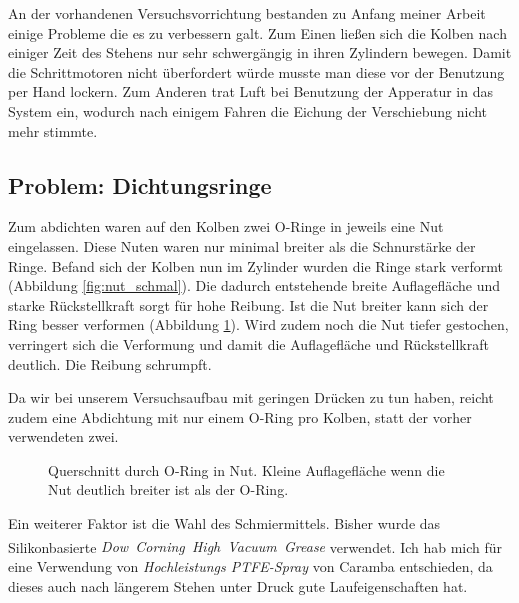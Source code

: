 \documentclass[
    11pt,
    ngerman
]{scrreprt}
\begin{document}
An der vorhandenen Versuchsvorrichtung bestanden zu Anfang meiner Arbeit einige
Probleme die es zu verbessern galt. Zum Einen ließen sich die Kolben nach
einiger Zeit des Stehens nur sehr schwergängig in ihren Zylindern bewegen.
Damit die Schrittmotoren nicht überfordert würde musste man diese vor der
Benutzung per Hand lockern. Zum Anderen trat Luft bei Benutzung der Apperatur
in das System ein, wodurch nach einigem Fahren die Eichung der Verschiebung
nicht mehr stimmte.  

\subsection{Problem: Dichtungsringe}

Zum abdichten waren auf den Kolben zwei O-Ringe in jeweils eine Nut
eingelassen. Diese Nuten waren nur minimal breiter als die Schnurstärke der
Ringe. Befand sich der Kolben nun im Zylinder wurden die Ringe stark verformt
(Abbildung \ref{fig:nut_schmal}). Die dadurch entstehende breite Auflagefläche
und starke Rückstellkraft sorgt für hohe Reibung. Ist die Nut breiter kann sich
der Ring besser verformen (Abbildung \ref{fig:nut_breit}). Wird zudem noch die
Nut tiefer gestochen, verringert sich die Verformung und damit die
Auflagefläche und Rückstellkraft deutlich. Die Reibung schrumpft.

Da wir bei unserem Versuchsaufbau mit geringen Drücken zu tun haben, reicht
zudem eine Abdichtung mit nur einem O-Ring pro Kolben, statt der vorher
verwendeten zwei.

\begin{figure}[htbp]
\begin{minipage}[htbp]{.45\textwidth}
    \centering
    
    \caption{%
        Querschnitt durch O-Ring in Nut. Breite Auflagefläche des O-Rings bei zu schmaler Nut.
    }
    \label{fig:nut_schmal}
\end{minipage}
\hfill
\begin{minipage}[htbp]{.45\textwidth}
    \centering
    
    \caption{%
        Querschnitt durch O-Ring in Nut. Kleine Auflagefläche wenn die Nut deutlich breiter ist als der O-Ring.
    }
    \label{fig:nut_breit}
\end{minipage}
\end{figure}

Ein weiterer Faktor ist die Wahl des Schmiermittels. Bisher wurde das
Silikonbasierte \emph{Dow~Corning\textsuperscript{\textregistered}~High~Vacuum~Grease} verwendet. Ich
hab mich für eine Verwendung von \emph{Hochleistungs
\textsc{PTFE}-Spray} von Caramba entschieden, da dieses auch nach
längerem Stehen unter Druck gute Laufeigenschaften hat.
\end{document}
